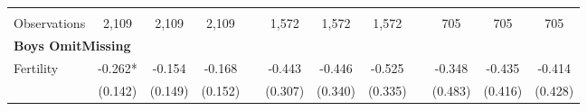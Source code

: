 \begin{landscape}
\begin{table}[htpb!]
\begin{center}
\begin{tabular}{lcccp{2mm}cccp{2mm}ccc}
\begin{footnotesize}\end{footnotesize}&\begin{footnotesize}\end{footnotesize}&\begin{footnotesize}\end{footnotesize}&\begin{footnotesize}\end{footnotesize}&\begin{footnotesize}\end{footnotesize}&\begin{footnotesize}\end{footnotesize}&\begin{footnotesize}\end{footnotesize}&\begin{footnotesize}\end{footnotesize}&\begin{footnotesize}\end{footnotesize}&\begin{footnotesize}\end{footnotesize}&\begin{footnotesize}\end{footnotesize}&\begin{footnotesize}\end{footnotesize}\\Observations&2,109&2,109&2,109&&1,572&1,572&1,572&&705&705&705\\
\multicolumn{12}{l}{\textbf{Boys OmitMissing}}\\ 
Fertility&-0.262*&-0.154&-0.168&&-0.443&-0.446&-0.525&&-0.348&-0.435&-0.414\\
&(0.142)&(0.149)&(0.152)&&(0.307)&(0.340)&(0.335)&&(0.483)&(0.416)&(0.428)\\

\end{tabular}
\end{center}
\end{table}
\end{landscape}
